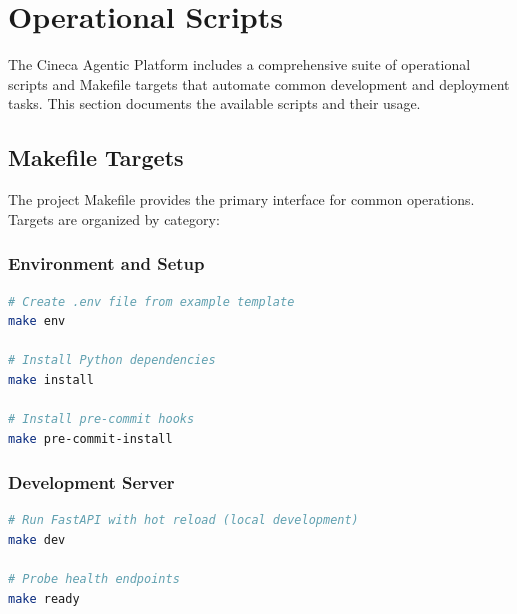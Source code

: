 
\section{Operational Scripts}
\label{sec:operational-scripts}

The Cineca Agentic Platform includes a comprehensive suite of operational scripts and Makefile targets that automate common development and deployment tasks. This section documents the available scripts and their usage.

\subsection{Makefile Targets}

The project Makefile provides the primary interface for common operations. Targets are organized by category:

\subsubsection{Environment and Setup}

\begin{lstlisting}[language=bash, caption=Environment setup targets]
# Create .env file from example template
make env

# Install Python dependencies
make install

# Install pre-commit hooks
make pre-commit-install
\end{lstlisting}

\subsubsection{Development Server}

\begin{lstlisting}[language=bash, caption=Development server targets]
# Run FastAPI with hot reload (local development)
make dev

# Probe health endpoints
make ready
\end{lstlisting}

